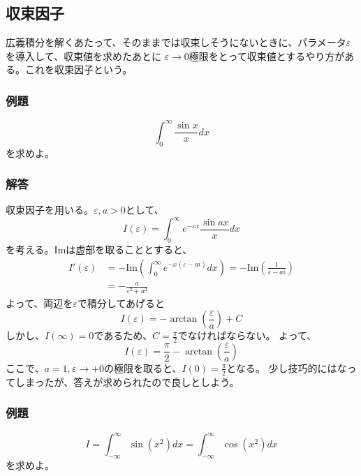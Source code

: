 \documentclass[a4j,dvipdfmx]{jsarticle}
\begin{document}
\subsection{収束因子}
広義積分を解くあたって、そのままでは収束しそうにないときに、パラメータ$\varepsilon$を導入して、収束値を求めたあとに
$\varepsilon\to 0$極限をとって収束値とするやり方がある。これを収束因子という。
\subsubsection*{例題}
\begin{equation*}
    \int_0^\infty \frac{\sin x}{x}dx
\end{equation*}
を求めよ。
\subsubsection*{解答}
収束因子を用いる。$\varepsilon,a>0$として、
\begin{equation*}
    I(\varepsilon)=\int_0^\infty e^{-\varepsilon x}\frac{\sin ax}{x}dx
\end{equation*}
を考える。$\mbox{Im}$は虚部を取ることとすると、
\begin{align*}
    I'(\varepsilon)&=-\mbox{Im}\left(\int_0^\infty e^{-x(\varepsilon-ai)}dx\right)=-\mbox{Im}\left(\frac{1}{\varepsilon-ai}\right)\\
    &=-\frac{a}{\varepsilon^2+a^2}
\end{align*}
よって、両辺を$\varepsilon$で積分してあげると
\begin{equation*}
    I(\varepsilon)=-\arctan\left(\frac{\varepsilon}{a}\right)+C
\end{equation*}
しかし、$I(\infty)=0$であるため、$C=\frac{\pi}{2}$でなければならない。
よって、
\begin{equation*}
    I(\varepsilon)=\frac{\pi}{2}-\arctan\left(\frac{\varepsilon}{a}\right)
\end{equation*}
ここで、$a=1,\varepsilon\to+0$の極限を取ると、$\displaystyle I(0)=\frac{\pi}{2}$となる。
少し技巧的にはなってしまったが、答えが求められたので良しとしよう。
\subsubsection*{例題}
\begin{equation*}
    I=\int_{-\infty}^\infty \sin(x^2)dx=\int_{-\infty}^\infty \cos(x^2)dx
\end{equation*}
を求めよ。
\end{document}
